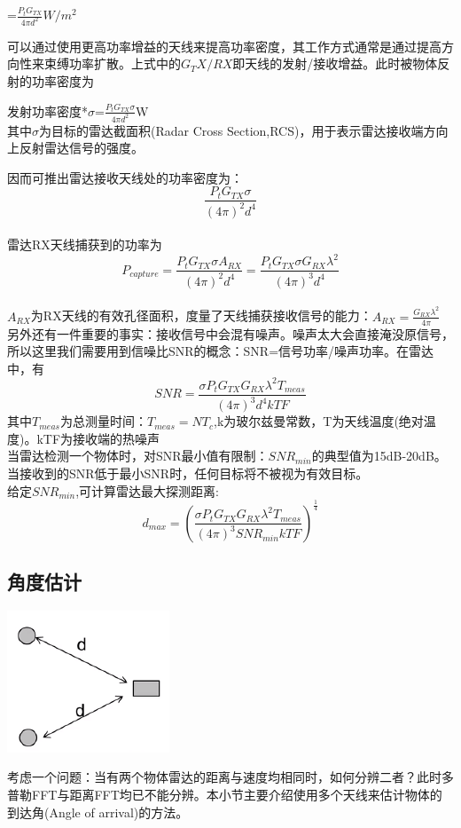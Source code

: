\documentclass[UTF8]{ctexart}
\begin{document}
{\centering
{}=\(\frac{P_tG_{TX}}{4\pi d^2}\)$W/m^2$\\
}

可以通过使用更高功率增益的天线来提高功率密度，其工作方式通常是通过提高方向性来束缚功率扩散。上式中的$G_TX/RX$即天线的发射/接收增益。此时被物体反射的功率密度为

{\centering
发射功率密度*$\sigma$=\(\frac{P_tG_{TX}\sigma}{4\pi d^2}\)W\\}
其中$\sigma$为目标的雷达截面积(Radar Cross Section,RCS)，用于表示雷达接收端方向上反射雷达信号的强度。

因而可推出雷达接收天线处的功率密度为：
\[\frac{P_tG_{TX}\sigma}{(4\pi)^2 d^4}\]\\
雷达RX天线捕获到的功率为
\[P_{capture}=
\frac{P_tG_{TX}\sigma A_{RX}}{(4\pi)^2 d^4}=
\frac{P_tG_{TX}\sigma G_{RX}\lambda^2}{(4\pi)^3 d^4}
\]\\
$A_{RX}$为RX天线的有效孔径面积，度量了天线捕获接收信号的能力：\(A_{RX}=\frac{G_{RX}\lambda^2}{4\pi}\)\\
另外还有一件重要的事实：接收信号中会混有噪声。噪声太大会直接淹没原信号，所以这里我们需要用到信噪比SNR的概念：SNR=信号功率/噪声功率。在雷达中，有
\[SNR=\frac{\sigma P_tG_{TX}G_{RX}\lambda^2 T_{meas}}{(4\pi)^3 d^4 kTF}\]
其中$T_{meas}$为总测量时间：$T_{meas}=NT_c$,k为玻尔兹曼常数，T为天线温度(绝对温度)。kTF为接收端的热噪声\\
当雷达检测一个物体时，对SNR最小值有限制：$SNR_{min}$的典型值为15dB-20dB。当接收到的SNR低于最小SNR时，任何目标将不被视为有效目标。\\
给定$SNR_{min}$,可计算雷达最大探测距离:
\[d_{max}=(\frac{\sigma P_tG_{TX}G_{RX}\lambda^2 T_{meas}}{(4\pi)^3 SNR_{min} kTF})^{\frac{1}{4}}\]

\subsection{角度估计}

{\centering \includegraphics[width = .3\textwidth]{pic/angleestimate.png}

}

考虑一个问题：当有两个物体雷达的距离与速度均相同时，如何分辨二者？此时多普勒FFT与距离FFT均已不能分辨。本小节主要介绍使用多个天线来估计物体的到达角(Angle of arrival)的方法。
\end{document}
